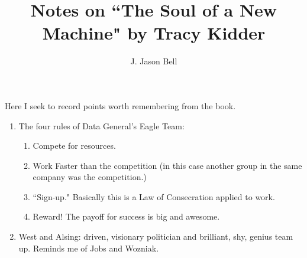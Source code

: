 \documentclass[11pt, oneside]{article}   	%
\title{Notes on ``The Soul of a New Machine" by Tracy Kidder}
\author{J. Jason Bell}
\begin{document}
 \maketitle

Here I seek to record points worth remembering from the book.  

\begin{enumerate}
\item The four rules of Data General's Eagle Team:
	\begin{enumerate}
	\item Compete for resources. 
	\item Work Faster than the competition (in this case another group in the same company was the competition.)
	\item ``Sign-up."  Basically this is a Law of Consecration applied to work.
	\item Reward!  The payoff for success is big and awesome.  
	\end{enumerate}

\item West and Alsing: driven, visionary politician and brilliant, shy, genius team up.  Reminds me of Jobs and Wozniak.
\end{enumerate}
\end{document}
